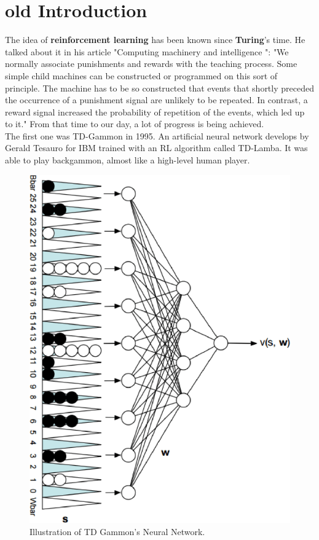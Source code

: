 

\chapter{old Introduction} %

\label{Chapter1} %
The idea of \textbf{reinforcement learning} has been known since \textbf{Turing}'s time.
He talked about it in his article "Computing machinery and intelligence \cite{turing2009computing}":
"We normally associate punishments and rewards with the teaching process. 
Some simple child machines can be constructed or programmed on this sort of principle. 
The machine has to be so constructed that events that shortly preceded the occurrence of a punishment signal are unlikely to be repeated. In contrast, a reward signal increased the probability of repetition of the events, which led up to it." 
From that time to our day, a lot of progress is being achieved.\\

The first one was \cite{tesauro1995temporal} TD-Gammon in 1995.
An artificial neural network develops by Gerald Tesauro for IBM trained with an RL algorithm called TD-Lamba.
It was able to play backgammon, almost like a high-level human player.

\begin{figure}[h]
\centering
\includegraphics[width=.6\textwidth, height=.5\textheight]{pictures/td_gammon}
                  \caption{ Illustration of TD Gammon’s Neural Network.}
            \end{figure}

